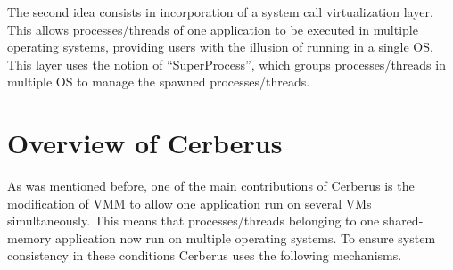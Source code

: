 \documentclass[journal]{IEEEtran}
\begin{document}
The second idea consists in incorporation of a system call
virtualization layer. This allows processes/threads of one application
to be executed in multiple operating systems, providing users with the
illusion of running in a single OS. This layer uses the notion of
``SuperProcess'', which groups processes/threads in multiple OS to
manage the spawned processes/threads.

\section{Overview of Cerberus}

As was mentioned before, one of the main contributions of Cerberus is the
modification of VMM to allow one application run on several VMs
simultaneously. This means that processes/threads belonging to one
shared-memory application now run on multiple operating systems. To
ensure system consistency in these conditions Cerberus uses the
following mechanisms.
\end{document}
